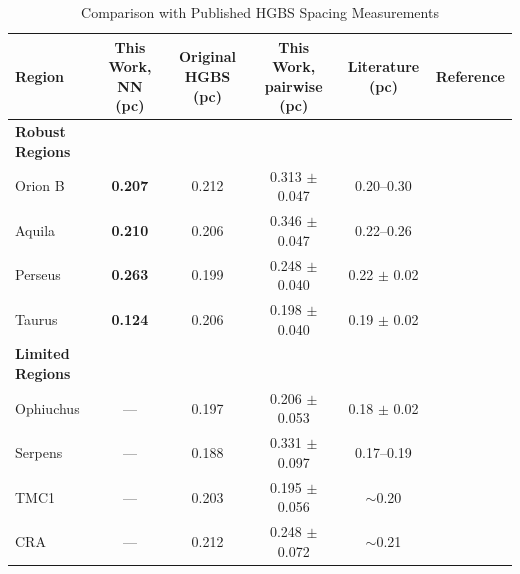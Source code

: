 \documentclass[usenatbib,twoside,twocolumn]{mnras}
\begin{document}
\begin{table}
\caption{Comparison with Published HGBS Spacing Measurements}
\label{tab:literature}
\begin{tabular}{lccccc}
\toprule
Region & This Work, NN (pc) & Original HGBS (pc) & This Work, pairwise (pc) & Literature (pc) & Reference \\
\midrule
\textbf{Robust Regions} &  &  &  &  &  \\
Orion B & \textbf{0.207} & 0.212 & 0.313 $\pm$ 0.047 & 0.20--0.30 & \citet{Konyves2020} \\
Aquila  & \textbf{0.210} & 0.206 & 0.346 $\pm$ 0.047 & 0.22--0.26 & \citet{Konyves2015} \\
Perseus & \textbf{0.263} & 0.199 & 0.248 $\pm$ 0.040 & 0.22 $\pm$ 0.02 & \citet{Pezzuto2021} \\
Taurus  & \textbf{0.124} & 0.206 & 0.198 $\pm$ 0.040 & 0.19 $\pm$ 0.02 & \citet{Hacar2013} \\
\midrule
\textbf{Limited Regions} &  &  &  &  &  \\
Ophiuchus & --- & 0.197 & 0.206 $\pm$ 0.053 & 0.18 $\pm$ 0.02 & \citet{Konyves2020} \\
Serpens  & --- & 0.188 & 0.331 $\pm$ 0.097 & 0.17--0.19 & \citet{Konyves2020} \\
TMC1     & --- & 0.203 & 0.195 $\pm$ 0.056 & $\sim$0.20 & \citet{Hacar2013} \\
CRA      & --- & 0.212 & 0.248 $\pm$ 0.072 & $\sim$0.21 & \citet{Konyves2020} \\
\bottomrule
\end{tabular}


\end{table}
\end{document}
